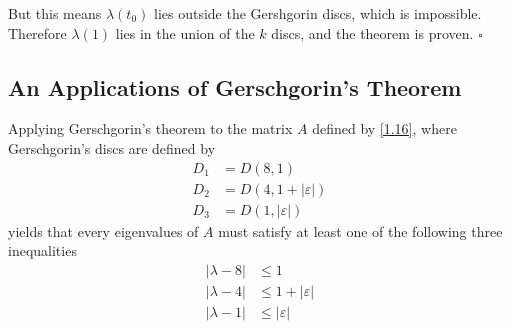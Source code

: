 \documentclass[a4paper,oneside]{book}
\numberwithin{equation}{chapter}
\begin{document}
But this means $\lambda \left(t_0\right)$ lies outside the Gershgorin discs, which is impossible. Therefore $\lambda \left(1\right)$ lies in the union of the $k$ discs, and the theorem is proven. \hfill $\square$
\subsection{An Applications of Gerschgorin's Theorem}
Applying Gerschgorin's theorem to the matrix $A$ defined by \eqref{1.16}, where Gerschgorin's discs are defined by
\begin{align}
{D_1} &= D\left( {8,1} \right)\\
{D_2} &= D\left( {4,1 + \left| \varepsilon  \right|} \right)\\
{D_3} &= D\left( {1,\left| \varepsilon  \right|} \right)
\end{align}
yields that every eigenvalues of $A$ must satisfy at least one of the following three inequalities
\begin{align}
\left| {\lambda  - 8} \right| &\le 1\\
\left| {\lambda  - 4} \right| &\le 1 + \left| \varepsilon  \right|\\
\left| {\lambda  - 1} \right| &\le \left| \varepsilon  \right|
\end{align}
\end{document}
